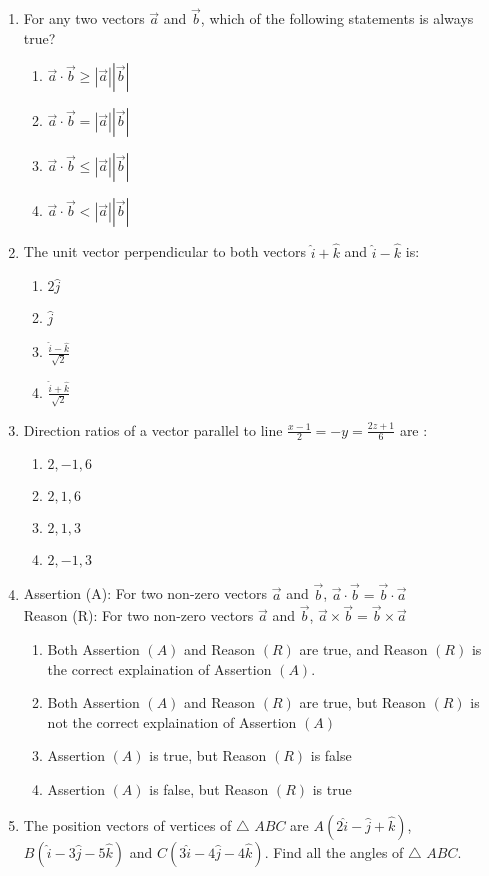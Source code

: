 \begin{enumerate}
	\item For any two vectors $\overrightarrow{a}$ and $\overrightarrow{b}$, which of the following statements is always true?
		\begin{enumerate}
			\item $\overrightarrow{a} \cdot \overrightarrow{b} \geq |\overrightarrow{a}||\overrightarrow{b}|$
			\item $\overrightarrow{a} \cdot \overrightarrow{b} = |\overrightarrow{a}||\overrightarrow{b}|$
			\item $\overrightarrow{a} \cdot \overrightarrow{b} \leq |\overrightarrow{a}||\overrightarrow{b}|$
			\item $\overrightarrow{a} \cdot \overrightarrow{b} < |\overrightarrow{a}||\overrightarrow{b}|$
		\end{enumerate}
	\item The unit vector perpendicular to both vectors $\hat{i} + \hat{k}$ and $\hat{i} - \hat{k}$ is:
		\begin{enumerate}
			\item $2\hat{j}$
			\item $\hat{j}$
			\item $\frac{\hat{i} - \hat{k}}{\sqrt{2}}$
			\item $\frac{\hat{i} + \hat{k}}{\sqrt{2}}$
		\end{enumerate}
	\item Direction ratios of a vector parallel to line $\frac{x - 1}{2}= -y = \frac{2z + 1}{6}$ are :
		\begin{enumerate}
			\item $2, -1, 6$
			\item $2, 1, 6$
			\item $2, 1, 3$
			\item $2, -1, 3$
		\end{enumerate}
	\item Assertion (A): For two non-zero vectors $\overrightarrow{a}$ and $\overrightarrow{b}$, $\overrightarrow{a} \cdot \overrightarrow{b} = \overrightarrow{b} \cdot \overrightarrow{a}$\\
		Reason (R): For two non-zero vectors $\overrightarrow{a}$ and $\overrightarrow{b}$, $\overrightarrow{a} \times \overrightarrow{b} = \overrightarrow{b} \times \overrightarrow{a}$
		\begin{enumerate}
			\item Both Assertion $(A)$ and Reason $(R)$ are true, and Reason $(R)$ is the correct explaination of Assertion $(A)$.
			\item Both Assertion $(A)$ and Reason $(R)$ are true, but Reason $(R)$ is not the correct explaination of Assertion $(A)$
			\item Assertion $(A)$ is true, but Reason $(R)$ is false
			\item Assertion $(A)$ is false, but Reason $(R)$ is true
		\end{enumerate}
	\item The position vectors of vertices of $\bigtriangleup$ $ABC$ are $A(2\hat{i} - \hat{j} + \hat{k})$, $B(\hat{i} - 3\hat{j} - 5\hat{k})$ and  $C(3\hat{i} - 4\hat{j} - 4\hat{k})$. Find all the angles of $\bigtriangleup$ $ABC$.
\end{enumerate}

